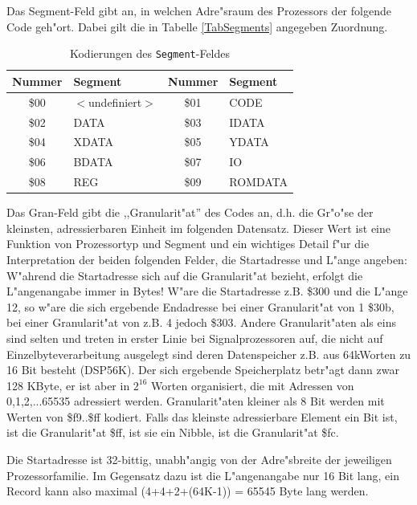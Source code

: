 \documentclass[12pt,a4paper,twoside]{report}
\begin{document}
Das Segment-Feld gibt an, in welchen Adre"sraum des Prozessors der
folgende Code geh"ort.  Dabei gilt die in Tabelle \ref{TabSegments}
angegeben Zuordnung.
\begin{table}[htbp]
\begin{center}\begin{tabular}{|c|l||c|l|}
\hline
Nummer & Segment & Nummer & Segment \\
\hline
\hline
\$00 &    $<$undefiniert$>$    & \$01 &    CODE \\
\$02 &    DATA                 & \$03 &    IDATA \\
\$04 &    XDATA                & \$05 &    YDATA \\
\$06 &    BDATA                & \$07 &    IO \\
\$08 &    REG                  & \$09 &    ROMDATA \\
\hline
\end{tabular}\end{center}
\caption{Kodierungen des {\tt Segment}-Feldes\label{TabSegments}
         \label{TabSegmentNums}}
\end{table}
Das Gran-Feld gibt die ,,Granularit"at'' des Codes an, d.h. die Gr"o"se
der kleinsten, adressierbaren Einheit im folgenden Datensatz.  Dieser
Wert ist eine Funktion von Prozessortyp und Segment und ein wichtiges
Detail f"ur die Interpretation der beiden folgenden Felder, die
Startadresse und L"ange angeben: W"ahrend die Startadresse sich auf die
Granularit"at bezieht, erfolgt die L"angenangabe immer in Bytes!  W"are
die Startadresse z.B. \$300 und die L"ange 12, so w"are die sich
ergebende Endadresse bei einer Granularit"at von 1 \$30b, bei einer
Granularit"at von z.B. 4 jedoch \$303.  Andere Granularit"aten als eins
sind selten und treten in erster Linie bei Signalprozessoren auf, die
nicht  auf Einzelbyteverarbeitung ausgelegt sind deren Datenspeicher z.B.
aus 64kWorten zu 16 Bit besteht (DSP56K).  Der sich ergebende Speicherplatz
betr"agt dann zwar 128 KByte, er ist aber in $2^{16}$ Worten organisiert,
die mit Adressen von 0,1,2,...65535 adressiert werden.  Granularit"aten
kleiner als 8 Bit werden mit Werten von \$f9..\$ff kodiert.  Falls das
kleinste adressierbare Element ein Bit ist, ist die Granularit"at \$ff,
ist sie ein Nibble, ist die Granularit"at \$fc.
\par
Die Startadresse ist 32-bittig, unabh"angig von der Adre"sbreite der
jeweiligen Prozessorfamilie.  Im Gegensatz dazu ist die L"angenangabe
nur 16 Bit lang, ein Record kann also maximal (4+4+2+(64K-1)) = 65545
Byte lang werden.
\end{document}
